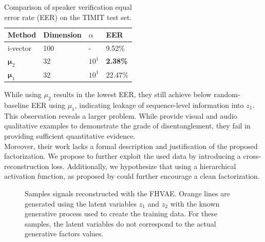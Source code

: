 \documentclass{article} %
\begin{document}
\begin{table}[tbh]
	\caption{Comparison of speaker verification equal error rate (EER) on the TIMIT test set.}
	\label{tab:eer}
	\centering
	\begin{tabular}{llll}
		\toprule
		Method 				& Dimension 	& $\alpha$ 		& EER  				 \\
		\midrule\midrule
		\multirow{1}{*}{i-vector}
		& 100   & -     & 9.52\%    \\
		\midrule
		\multirow{1}{*}{$\bm{\mu}_2$}  	& 32			& $10^1$	& \textbf{2.38\%}  	 	\\
		\midrule
		\multirow{1}{*}{$\bm{\mu}_1$}
	& 32			& $10^1$		& 22.47\%   	\\
		\bottomrule
	\end{tabular}
\end{table}
While using $\mu_2$ results in the lowest EER, they still achieve below random-baseline EER using $\mu_1$, indicating leakage of sequence-level information into $z_1$.\\
This observation reveals a larger problem. While \citet{hsu2017unsupervised} provide visual and audio qualitative examples to demonstrate the grade of disentanglement, they fail in providing sufficient quantitative evidence.\\
Moreover, their work lacks a formal description and justification of the proposed factorization. We propose to further exploit the used data by introducing a cross-reconstruction loss.
Additionally, we hypothesize that using a hierarchical activation function, as proposed by \citet{shen2018ordered} could further encourage a clean factorization.

\begin{figure}[t]\scriptsize
%
\centering
\caption{Samples signals reconstructed with the FHVAE. Orange lines are generated using the latent variables $z_1$ and $z_2$ with the known generative process used to create the training data. For these samples, the latent variables do not correspond to the actual generative factors values.}
\end{figure}
%
%
%
%
%
%
\end{document}
